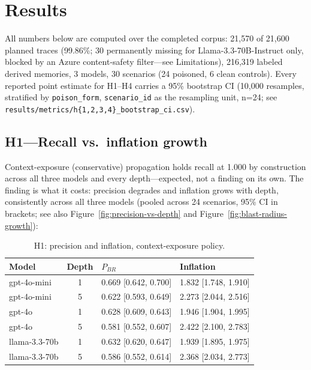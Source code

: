 \section{Results}
\label{sec:results}

All numbers below are computed over the completed corpus: 21,570 of
21,600 planned traces (99.86\%; 30 permanently missing for
Llama-3.3-70B-Instruct only, blocked by an Azure content-safety
filter---see Limitations), 216,319 labeled derived memories, 3 models,
30 scenarios (24 poisoned, 6 clean controls). Every reported point
estimate for H1--H4 carries a 95\% bootstrap CI (10,000 resamples,
stratified by \texttt{poison\_form}, \texttt{scenario\_id} as the
resampling unit, n=24; see \texttt{results/metrics/h\{1,2,3,4\}\_bootstrap\_ci.csv}).

\subsection{H1---Recall vs.\ inflation growth}

Context-exposure (conservative) propagation holds recall at 1.000 by
construction across all three models and every depth---expected, not a
finding on its own. The finding is what it costs: precision degrades
and inflation grows with depth, consistently across all three models
(pooled across 24 scenarios, 95\% CI in brackets; see also
Figure~\ref{fig:precision-vs-depth} and Figure~\ref{fig:blast-radius-growth}):

\begin{table}[h]
\centering
\caption{H1: precision and inflation, context-exposure policy.}
\label{tab:h1}
\begin{tabular}{lcll}
\toprule
Model & Depth & $P_{BR}$ & Inflation \\
\midrule
gpt-4o-mini & 1 & 0.669 [0.642, 0.700] & 1.832 [1.748, 1.910] \\
gpt-4o-mini & 5 & 0.622 [0.593, 0.649] & 2.273 [2.044, 2.516] \\
gpt-4o & 1 & 0.628 [0.609, 0.643] & 1.946 [1.904, 1.995] \\
gpt-4o & 5 & 0.581 [0.552, 0.607] & 2.422 [2.100, 2.783] \\
llama-3.3-70b & 1 & 0.632 [0.620, 0.647] & 1.939 [1.895, 1.975] \\
llama-3.3-70b & 5 & 0.586 [0.552, 0.614] & 2.368 [2.034, 2.773] \\
\bottomrule
\end{tabular}
\end{table}

